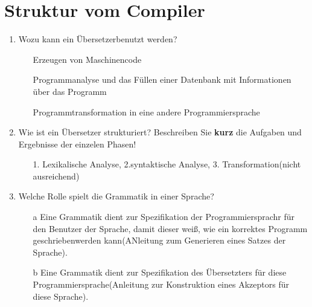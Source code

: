 \documentclass[
  ngerman
  ,12pt
  ,pdftex
]{article}
\begin{document}
\section{Struktur vom Compiler}
\begin{enumerate}
  \item Wozu kann ein Übersetzerbenutzt werden?
  \begin{itemize}
    \item [] Erzeugen von Maschinencode 
    \item [] Programmanalyse und das Füllen einer Datenbank mit Informationen über das Programm
    \item [] Programmtransformation in eine andere Programmiersprache
  \end{itemize}
  \item Wie ist ein Übersetzer strukturiert? Beschreiben Sie \textbf{kurz} die Aufgaben und Ergebnisse der einzelen Phasen!
  \begin{itemize}
    \item []1. Lexikalische Analyse, 2.syntaktische Analyse, 3. Transformation(nicht ausreichend)
  \end{itemize}
  \item Welche Rolle spielt die Grammatik in einer Sprache?
  \begin{itemize}
    \item [a]Eine Grammatik dient zur Spezifikation der Programmiersprachr für den Benutzer der Sprache, damit dieser weiß, wie ein korrektes Programm geschriebenwerden kann(ANleitung zum Generieren eines Satzes der Sprache).
    \item [b]Eine Grammatik dient zur Spezifikation des Übersetzters für diese Programmiersprache(Anleitung zur Konstruktion eines Akzeptors für diese Sprache).
  \end{itemize}
\end{enumerate}
\end{document}
